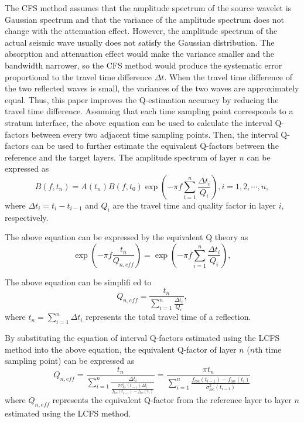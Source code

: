 The CFS method assumes that the amplitude spectrum of the source
wavelet is Gaussian spectrum and that the variance of the amplitude
spectrum does not change with the attenuation effect. However, the
amplitude spectrum of the actual seismic wave usually does not satisfy
the Gaussian distribution. The absorption and attenuation effect would
make the variance smaller and the bandwidth narrower, so the CFS
method would produce the systematic error proportional to the travel
time difference $\Delta t$. When the travel time difference of the two
reflected waves is small, the variances of the two waves are
approximately equal. Thus, this paper improves the Q-estimation
accuracy by reducing the travel time difference. Assuming that each
time sampling point corresponds to a stratum interface, the above
equation can be used to calculate the interval Q-factors between every
two adjacent time sampling points. Then, the interval Q-factors can be
used to further estimate the equivalent Q-factors between the
reference and the target layers. The amplitude spectrum of layer $n$
can be expressed as \cite[]{Zhang02}
\begin{equation}
  \label{eq:16}
  B(f,t_n)=A(t_n)B(f,t_0)\exp(-\pi f\sum_{i=1}^n\frac{\Delta t_i}{Q_i}),
  i=1,2,\cdots,n ,
\end{equation}
where $\Delta t_i=t_i-t_{i-1}$ and $Q_i$ are the travel time and quality
factor in layer $i$, respectively.

The above equation can be expressed by the equivalent Q theory as
\begin{equation}
  \label{eq:17}
  \exp(-\pi f\frac{t_n}{Q_{n,eff}})=\exp(-\pi f\sum_{i=1}^n\frac{\Delta t_i}
      {Q_i}),
\end{equation}

The above equation can be simplifi ed to
\begin{equation}
  \label{eq:18}
  Q_{n,eff}=\frac{t_n}{\sum_{i=1}^n\frac{\Delta t_i}{Q_i}},
\end{equation}
where $t_n=\sum_{i=1}^n\Delta t_i$ represents the total travel time of a
reflection.

By substituting the equation of interval Q-factors estimated using the LCFS
method into the above equation, the equivalent Q-factor of layer $n$ ($n$th
time sampling point) can be expressed as
\begin{equation}
  \label{eq:19}
  Q_{n,eff}=\frac{t_n}{\sum_{i=1}^n\frac{\Delta t_i}{\frac{\pi\sigma_{loc}^2
        (t_{i-1})\Delta t_i}{f_{loc}(t_{i-1})-f_{loc}(t_i)}}}=\frac{\pi t_n}
  {\sum_{i=1}^n\frac{f_{loc}(t_{i-1})-f_{loc}(t_i)}{\sigma_{loc}^2(t_{i-1})}}
\end{equation}
where $Q_{n,eff}$ represents the equivalent Q-factor from the reference layer
to layer $n$ estimated using the LCFS method.


